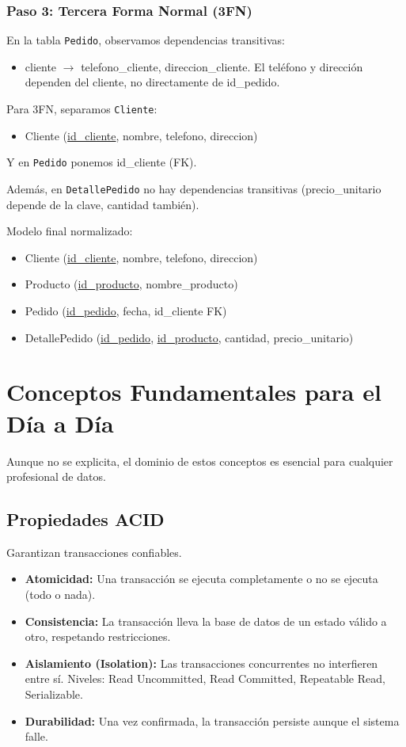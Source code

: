 \documentclass[12pt,a4paper,openany,oneside]{book}
\begin{document}
\subsection{Paso 3: Tercera Forma Normal (3FN)}
En la tabla \texttt{Pedido}, observamos dependencias transitivas:
\begin{itemize}
    \item cliente $\rightarrow$ telefono\_cliente, direccion\_cliente. El teléfono y dirección dependen del cliente, no directamente de id\_pedido.
\end{itemize}
Para 3FN, separamos \texttt{Cliente}:
\begin{itemize}
    \item Cliente (\underline{id\_cliente}, nombre, telefono, direccion)
\end{itemize}
Y en \texttt{Pedido} ponemos id\_cliente (FK).

Además, en \texttt{DetallePedido} no hay dependencias transitivas (precio\_unitario depende de la clave, cantidad también).

Modelo final normalizado:
\begin{itemize}
    \item Cliente (\underline{id\_cliente}, nombre, telefono, direccion)
    \item Producto (\underline{id\_producto}, nombre\_producto)
    \item Pedido (\underline{id\_pedido}, fecha, id\_cliente FK)
    \item DetallePedido (\underline{id\_pedido}, \underline{id\_producto}, cantidad, precio\_unitario)
\end{itemize}

\chapter{Conceptos Fundamentales para el Día a Día}
Aunque no se explicita, el dominio de estos conceptos es esencial para cualquier profesional de datos.

\section{Propiedades ACID}
Garantizan transacciones confiables.
\begin{itemize}
    \item \textbf{Atomicidad:} Una transacción se ejecuta completamente o no se ejecuta (todo o nada).
    \item \textbf{Consistencia:} La transacción lleva la base de datos de un estado válido a otro, respetando restricciones.
    \item \textbf{Aislamiento (Isolation):} Las transacciones concurrentes no interfieren entre sí. Niveles: Read Uncommitted, Read Committed, Repeatable Read, Serializable.
    \item \textbf{Durabilidad:} Una vez confirmada, la transacción persiste aunque el sistema falle.
\end{itemize}
\end{document}
